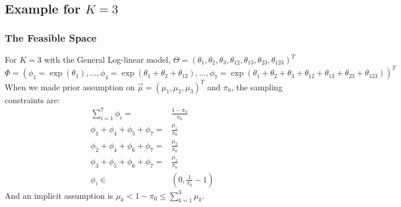 \documentclass[11 pt, a4paper]{article}  %
\begin{document}
\newpage
\subsection{Example for $K=3$}
\subsubsection{The Feasible Space}
For $K=3$ with the General Log-linear model,
$\Theta = (\theta_1, \theta_2, \theta_3, \theta_{12}, \theta_{13}, \theta_{23}, \theta_{123})^T$\\
$\Phi = (\phi_1 = \exp{(\theta_1)}, \ldots, \phi_4 = \exp{(\theta_1 + \theta_2 + \theta_{12})}, \ldots, 
\phi_7 = \exp{(\theta_1 + \theta_2 + \theta_3 + \theta_{12} + \theta_{13} + \theta_{23} + \theta_{123})} )^T$
When we made prior assumption on $\vec{\mu} = (\mu_1, \mu_2, \mu_3)^T$ and $\pi_0$, the sampling constraints are:
\begin{align*}
\sum_{i=1}^7 \phi_i = & \frac{1-\pi_0}{\pi_0}\\
\phi_1 + \phi_4 + \phi_5 + \phi_7 = & \frac{\mu_1}{\pi_0}\\
\phi_2 + \phi_4 + \phi_6 + \phi_7 = & \frac{\mu_2}{\pi_0}\\
\phi_3 + \phi_5 + \phi_6 + \phi_7 = & \frac{\mu_3}{\pi_0}\\
\phi_i \in & (0, \frac{1}{\pi_0}-1)
\end{align*}
And an implicit assumption is $\mu_k < 1 - \pi_0 \leq \sum_{k=1}^3 \mu_k$.\\
\end{document}
